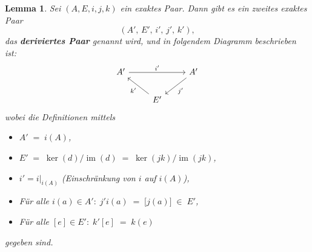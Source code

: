 \documentclass[12pt]{article}
\numberwithin{conj}{section}
\newtheorem{lemma}[conj]{Lemma}
\newcommand{\ima}{\operatorname{im}}
\begin{document}
    \begin{lemma}
        Sei $(A,E,i,j,k)$ ein exaktes Paar. Dann gibt es ein zweites exaktes Paar
        \[
            (A',\,E',\,i',\,j',\,k'),
        \]
        das \textbf{deriviertes Paar} genannt wird, und in folgendem Diagramm
        beschrieben ist:
        \[
            \begin{tikzcd}
                A' && A' \\ & E' \arrow["i'", from=1-1, to=1-3] \arrow["j'", from=1-3,
                to=2-2] \arrow["k'", from=2-2, to=1-1]
            \end{tikzcd}
        \]
        wobei die Definitionen mittels
        \begin{itemize}[nolistsep]
            \item $A' \;=\; i(A)$,

            \item $E' \;=\; \ker(d)\big/\ima(d) \;=\; \ker(jk)\big/\ima(jk)$,

            \item $i' = i\vert_{i(A)}$ (Einschränkung von $i$ auf $i(A)$),

            \item Für alle $i(a) \in A':\; j' i(a)  \;=\; \bigl[j(a)\bigr] \;
                \in\; E'$,

            \item Für alle $[e] \in E':\; k' [e]  \;=\; k(e)$
        \end{itemize}
        gegeben sind.
    \end{lemma}
\end{document}
